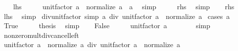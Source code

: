 \begin{isabellebody}
%
\isadelimproof
%
\endisadelimproof
%
\isatagproof
{}\isamarkupfalse%
\isanewline
\ \ \isamarkupfalse%
\ {\isacharquery}{\kern0pt}lhs\isanewline
\ \ \isamarkupfalse%
\ \isamarkupfalse%
\ {\isachardoublequoteopen}unit{\isacharunderscore}{\kern0pt}factor\ a\ {\isacharasterisk}{\kern0pt}\ normalize\ a\ {\isacharequal}{\kern0pt}\ a{\isachardoublequoteclose}\ \isamarkupfalse%
\ simp\isanewline
\ \ \isamarkupfalse%
\ \isamarkupfalse%
\ {\isacharquery}{\kern0pt}rhs\ \isamarkupfalse%
\ simp\isanewline
{}\isamarkupfalse%
\isanewline
\ \ \isamarkupfalse%
\ {\isacharquery}{\kern0pt}rhs\isanewline
\ \ \isamarkupfalse%
\ \isamarkupfalse%
\ {\isacharquery}{\kern0pt}lhs\ \isamarkupfalse%
\ simp\isanewline
{}\isamarkupfalse%
%
\endisatagproof
{\isafoldproof}%
%
\isadelimproof
\isanewline
%
\endisadelimproof
\isanewline
{}\isamarkupfalse%
\ div{\isacharunderscore}{\kern0pt}unit{\isacharunderscore}{\kern0pt}factor\ {\isacharbrackleft}{\kern0pt}simp{\isacharbrackright}{\kern0pt}{\isacharcolon}{\kern0pt}\ {\isachardoublequoteopen}a\ div\ unit{\isacharunderscore}{\kern0pt}factor\ a\ {\isacharequal}{\kern0pt}\ normalize\ a{\isachardoublequoteclose}\isanewline
%
\isadelimproof
%
\endisadelimproof
%
\isatagproof
{}\isamarkupfalse%
\ {\isacharparenleft}{\kern0pt}cases\ {\isachardoublequoteopen}a\ {\isacharequal}{\kern0pt}\ {}{\isachardoublequoteclose}{\isacharparenright}{\kern0pt}\isanewline
\ \ \isamarkupfalse%
\ True\isanewline
\ \ \isamarkupfalse%
\ \isamarkupfalse%
\ {\isacharquery}{\kern0pt}thesis\ \isamarkupfalse%
\ simp\isanewline
{}\isamarkupfalse%
\isanewline
\ \ \isamarkupfalse%
\ False\isanewline
\ \ \isamarkupfalse%
\ \isamarkupfalse%
\ {\isachardoublequoteopen}unit{\isacharunderscore}{\kern0pt}factor\ a\ {\isasymnoteq}\ {}{\isachardoublequoteclose}\isanewline
\ \ \ \ \isamarkupfalse%
\ simp\isanewline
\ \ \isamarkupfalse%
\ nonzero{\isacharunderscore}{\kern0pt}mult{\isacharunderscore}{\kern0pt}div{\isacharunderscore}{\kern0pt}cancel{\isacharunderscore}{\kern0pt}left\isanewline
\ \ \isamarkupfalse%
\ {\isachardoublequoteopen}unit{\isacharunderscore}{\kern0pt}factor\ a\ {\isacharasterisk}{\kern0pt}\ normalize\ a\ div\ unit{\isacharunderscore}{\kern0pt}factor\ a\ {\isacharequal}{\kern0pt}\ normalize\ a{\isachardoublequoteclose}\isanewline

\end{isabellebody}
